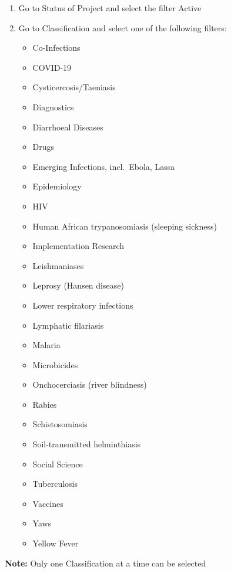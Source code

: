 \documentclass[
]{book}
\providecommand{\tightlist}{%
  \setlength{\itemsep}{0pt}\setlength{\parskip}{0pt}}
\begin{document}
\begin{enumerate}
\def\labelenumi{\arabic{enumi}.}
\item
  Go to Status of Project and select the filter Active
\item
  Go to Classification and select one of the following filters:

  \begin{itemize}
  \tightlist
  \item
    Co-Infections
  \item
    COVID-19
  \item
    Cysticercosis/Taeniasis\\
  \item
    Diagnostics
  \item
    Diarrhoeal Diseases
  \item
    Drugs
  \item
    Emerging Infections, incl.~Ebola, Lassa
  \item
    Epidemiology
  \item
    HIV
  \item
    Human African trypanosomiasis (sleeping sickness)\\
  \item
    Implementation Research\\
  \item
    Leishmaniases
  \item
    Leprosy (Hansen disease)
  \item
    Lower respiratory infections\\
  \item
    Lymphatic filariasis
  \item
    Malaria
  \item
    Microbicides
  \item
    Onchocerciasis (river blindness)
  \item
    Rabies
  \item
    Schistosomiasis
  \item
    Soil-transmitted helminthiasis\\
  \item
    Social Science
  \item
    Tuberculosis
  \item
    Vaccines
  \item
    Yaws
  \item
    Yellow Fever
  \end{itemize}
\end{enumerate}

\textbf{Note:} Only one Classification at a time can be selected
\end{document}
